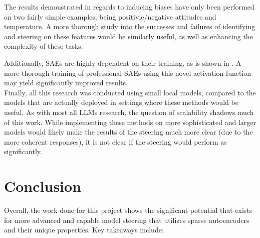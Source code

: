 \documentclass{article}
\begin{document}
The results demonstrated in regards to inducing biases have only been performed on two fairly simple examples, being positivie/negative attitudes and temperature. A more thorough study into the successes and failures of identifying and steering on these features would be similarly useful, as well as enhancing the complexity of these tasks.

Additionally, SAEs are highly dependent on their training, as is shown in \cite{training}. A more thorough training of professional SAEs using this novel activation function may yield significantly improved results.\\

Finally, all this research was conducted using small local models, compared to the models that are actually deployed in settings where these methods would be useful. As with most all LLMs research, the question of scalability shadows much of this work. While implementing these methods on more sophisticated and larger models would likely make the results of the steering much more clear (due to the more coherent responses), it is not clear if the steering would perform as significantly.

\section{Conclusion}

Overall, the work done for this project shows the significant potential that exists for more advanced and capable model steering that utilizes sparse autoencoders and their unique properties. Key takeaways include:
\end{document}
